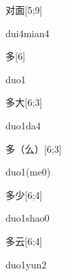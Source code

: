 \begin{verbete}{对面}[5;9]
\begin{pronuncia}{dui4mian4}
\end{pronuncia}
\end{verbete}

\begin{verbete}[duo1]{多}[6]
\begin{pronuncia}{duo1}
\end{pronuncia}
\end{verbete}

\begin{verbete}[duo1da4]{多大}[6;3]
\begin{pronuncia}{duo1da4}
\end{pronuncia}
\end{verbete}

\begin{verbete}[duo1(me0)]{多（么）}[6;3]
\begin{pronuncia}{duo1(me0)}
\end{pronuncia}
\end{verbete}

\begin{verbete}{多少}[6;4]
\begin{pronuncia}{duo1shao0}
\end{pronuncia}
\end{verbete}

\begin{verbete}{多云}[6;4]
\begin{pronuncia}{duo1yun2}
\end{pronuncia}
\end{verbete}

